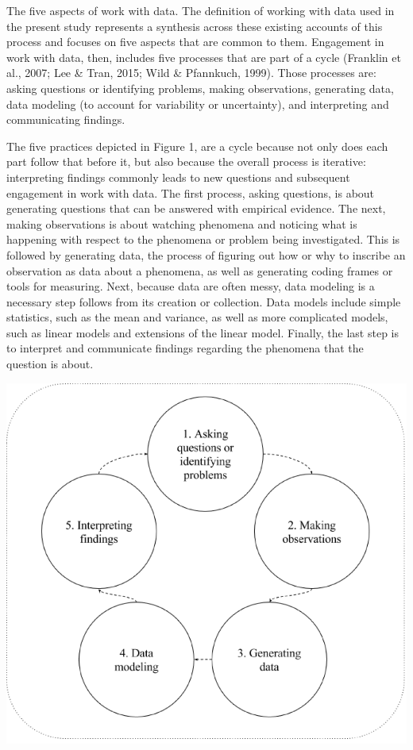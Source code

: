 \documentclass[]{book}
\theoremstyle{definition}
\theoremstyle{definition}
\theoremstyle{definition}
\theoremstyle{remark}
\begin{document}
The five aspects of work with data. The definition of working with data
used in the present study represents a synthesis across these existing
accounts of this process and focuses on five aspects that are common to
them. Engagement in work with data, then, includes five processes that
are part of a cycle (Franklin et al., 2007; Lee \& Tran, 2015; Wild \&
Pfannkuch, 1999). Those processes are: asking questions or identifying
problems, making observations, generating data, data modeling (to
account for variability or uncertainty), and interpreting and
communicating findings.

The five practices depicted in Figure 1, are a cycle because not only
does each part follow that before it, but also because the overall
process is iterative: interpreting findings commonly leads to new
questions and subsequent engagement in work with data. The first
process, asking questions, is about generating questions that can be
answered with empirical evidence. The next, making observations is about
watching phenomena and noticing what is happening with respect to the
phenomena or problem being investigated. This is followed by generating
data, the process of figuring out how or why to inscribe an observation
as data about a phenomena, as well as generating coding frames or tools
for measuring. Next, because data are often messy, data modeling is a
necessary step follows from its creation or collection. Data models
include simple statistics, such as the mean and variance, as well as
more complicated models, such as linear models and extensions of the
linear model. Finally, the last step is to interpret and communicate
findings regarding the phenomena that the question is about.

\begin{center}\includegraphics[width=0.8\linewidth]{images/figure1} \end{center}
\end{document}
